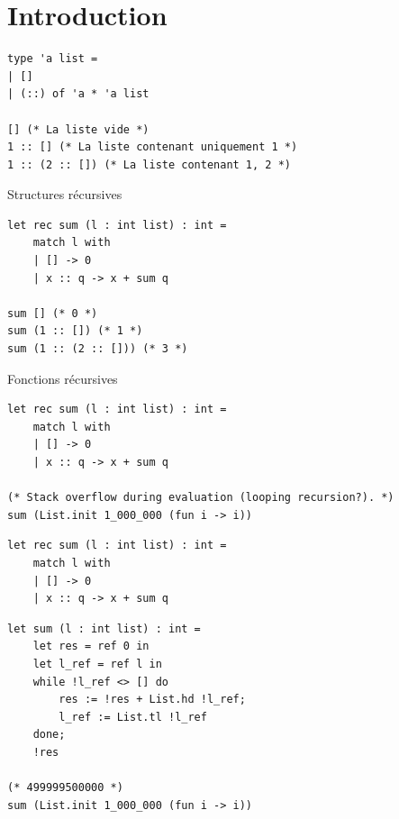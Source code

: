 \section{Introduction}

\begin{frame}[fragile,t]
    \begin{center}
        \begin{verbatim}
type 'a list =
| []
| (::) of 'a * 'a list

[] (* La liste vide *)
1 :: [] (* La liste contenant uniquement 1 *)
1 :: (2 :: []) (* La liste contenant 1, 2 *)
        \end{verbatim}

        \small Structures récursives

        \pause

        \begin{verbatim}
let rec sum (l : int list) : int =
    match l with
    | [] -> 0
    | x :: q -> x + sum q

sum [] (* 0 *)
sum (1 :: []) (* 1 *)
sum (1 :: (2 :: [])) (* 3 *)
        \end{verbatim}

        \small Fonctions récursives
    \end{center}
\end{frame}

\begin{frame}[fragile,t]
    \begin{verbatim}
let rec sum (l : int list) : int =
    match l with
    | [] -> 0
    | x :: q -> x + sum q

(* Stack overflow during evaluation (looping recursion?). *)
sum (List.init 1_000_000 (fun i -> i))
    \end{verbatim}
\end{frame}

\begin{frame}[fragile,t]
    \begin{verbatim}
let rec sum (l : int list) : int =
    match l with
    | [] -> 0
    | x :: q -> x + sum q
    \end{verbatim}

    \vspace{0.5cm}

    \begin{verbatim}
let sum (l : int list) : int =
    let res = ref 0 in
    let l_ref = ref l in
    while !l_ref <> [] do
        res := !res + List.hd !l_ref;
        l_ref := List.tl !l_ref
    done;
    !res

(* 499999500000 *)
sum (List.init 1_000_000 (fun i -> i))
    \end{verbatim}
\end{frame}

